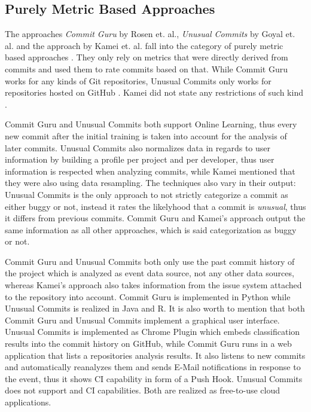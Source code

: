\subsection{Purely Metric Based Approaches}

The approaches \textit{Commit Guru} by Rosen et. al., \textit{Unusual Commits} by Goyal et. al. and the approach by Kamei et. al. fall into the category of purely metric based approaches \cite{Rosen2015,Goyal2017,Kamei2013}. They only rely on metrics that were directly derived from commits and used them to rate commits based on that. While Commit Guru works for any kinds of Git repositories, Unusual Commits only works for repositories hosted on GitHub \cite{Rosen2015,Goyal2017}. Kamei did not state any restrictions of such kind \cite{Kamei2013}.

Commit Guru and Unusual Commits both support Online Learning, thus every new commit after the initial training is taken into account for the analysis of later commits.
Unusual Commits also normalizes data in regards to user information by building a profile per project and per developer, thus user information is respected when analyzing commits, 
while Kamei mentioned that they were also using data resampling.
The techniques also vary in their output: Unusual Commits is the only approach to not strictly categorize a commit as either buggy or not, instead it rates the likelyhood that a commit is \textit{unusual}, thus it differs from previous commits. Commit Guru and Kamei's approach output the same information as all other approaches, which is said categorization as buggy or not. \cite{Rosen2015,Goyal2017,Kamei2013}

Commit Guru and Unusual Commits both only use the past commit history of the project which is analyzed as event data source, not any other data sources, whereas Kamei's approach also takes information from the issue system attached to the repository into account.
Commit Guru is implemented in Python while Unusual Commits is realized in Java and R. It is also worth to mention that both Commit Guru and Unusual Commits implement a graphical user interface. Unusual Commits is implemented as Chrome Plugin which embeds classification results into the commit history on GitHub, while Commit Guru runs in a web application that lists a repositories analysis results. It also listens to new commits and automatically reanalyzes them and sends E-Mail notifications in response to the event, thus it shows CI capability in form of a Push Hook. Unusual Commits does not support and CI capabilities. Both are realized as free-to-use cloud applications. \cite{Rosen2015,Goyal2017,Kamei2013}

